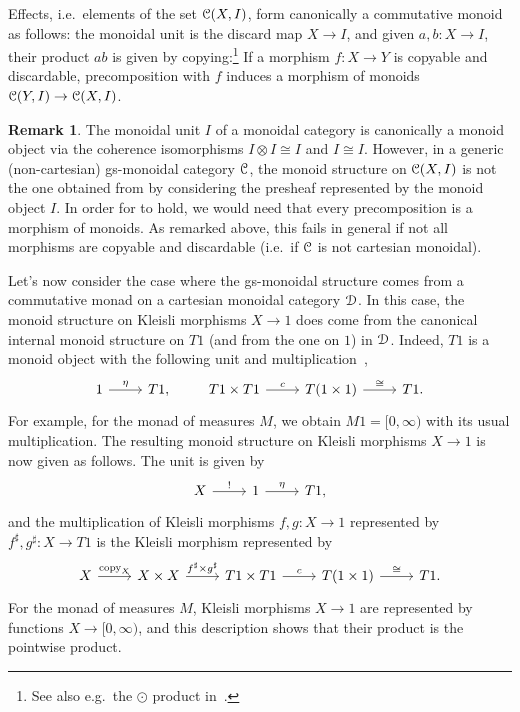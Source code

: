 \documentclass[a4paper,UKenglish,numberwithinsect,cleveref, autoref, thm-restate]{lipics-v2021}
\theoremstyle{plain} %
\theoremstyle{definition} %
\newtheorem{myremark}[mytheorem]{Remark}
\begin{document}
 Effects, i.e.~elements of the set $\mathcal{C}(X,I)$, form canonically a commutative monoid as follows: the monoidal unit is the discard map $X\to I$, and given $a,b:X\to I$, their product $ab$ is given by copying:\footnote{See also e.g.~the $\odot$ product in~\cite[Proposition~3.10]{coecke2011phasegroups}.}
If a morphism $f:X\to Y$ is copyable and discardable, precomposition with $f$ induces a morphism of monoids $\mathcal{C}(Y,I)\to\mathcal{C}(X,I)$. 

\begin{myremark}
 The monoidal unit $I$ of a monoidal category is canonically a monoid object via the coherence isomorphisms $I\otimes I\cong I$ and $I\cong I$. 
 However, in a generic (non-cartesian) gs-monoidal category $\mathcal{C}$, the monoid structure on $\mathcal{C}(X,I)$ is not the one obtained from  by considering the presheaf represented by the monoid object $I$. In order for  to hold, we would need that every precomposition is a morphism of monoids. As remarked above, this fails in general if not all morphisms are copyable and discardable (i.e.~if $\mathcal{C}$ is not cartesian monoidal).
\end{myremark}


Let's now consider the case where the gs-monoidal structure comes from a commutative monad on a cartesian monoidal category $\mathcal{D}$. 
In this case, the monoid structure on Kleisli morphisms $X\to 1$ does come from the canonical internal monoid structure on $T1$ (and from the one on $1$) in $\mathcal{D}$.
Indeed, $T1$ is a monoid object with the following unit and multiplication~\cite[Section~10]{kock2012distributions},
 \[
 \begin{tikzcd}
  1 \ar{r}{\eta} & T1 ,
 \end{tikzcd}
 \qquad
 \begin{tikzcd}
  T1 \times T1 \ar{r}{c} & T(1\times 1) \ar{r}{\cong} & T1 .
 \end{tikzcd}
 \]
 For example, for the monad of measures $M$, we obtain $M1=[0,\infty)$ with its usual multiplication.
 The resulting monoid structure on Kleisli morphisms $X\to 1$ is now given as follows. The unit is given by
 \[
 \begin{tikzcd}
  X \ar{r}{!} & 1 \ar{r}{\eta} & T1 ,
 \end{tikzcd}
 \]
 and the multiplication of Kleisli morphisms $f, g : X \to 1$ represented by $f^\sharp,g^\sharp:X\to T1$ is the Kleisli morphism represented by
 \[
 \begin{tikzcd}
  X \ar{r}{\mathrm{copy}_X} & X\times X \ar{r}{f^\sharp\times g^\sharp} &
  T1 \times T1 \ar{r}{c} & T(1\times 1) \ar{r}{\cong} & T1 .
 \end{tikzcd}
 \]
 For the monad of measures $M$, Kleisli morphisms $X\to 1$ are represented by functions $X\to [0,\infty)$, and this description shows that their product is the pointwise product.
\end{document}
